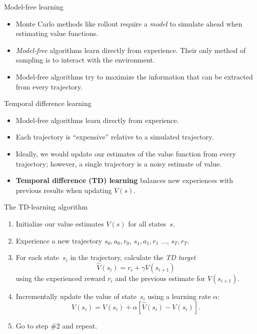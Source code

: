 \documentclass[9pt]{beamer}
\newcommand\lspace{\addtolength{\itemsep}{0.5\baselineskip}}
\begin{document}
\begin{frame}{Model-free learning}

\begin{itemize}\lspace
	\item Monte Carlo methods like rollout require a \emph{model} to simulate ahead when estimating value functions.
	\item \emph{Model-free} algorithms learn directly from experience. Their only method of sampling is to interact with the environment.
	\item Model-free algorithms try to maximize the information that can be extracted from every trajectory.
\end{itemize}
	
\end{frame}

\begin{frame}{Temporal difference learning}

\begin{itemize}\lspace
	\item Model-free algorithms learn directly from experience.
	\item Each trajectory is ``expensive'' relative to a simulated trajectory.
	\item Ideally, we would update our estimates of the value function from every trajectory; however, a single trajectory is a noisy estimate of value.
	\item \textbf{Temporal difference (TD) learning} balances new experiences with previous results when updating $V(s)$.
\end{itemize}

\end{frame}

\begin{frame}{The TD-learning algorithm}

\begin{enumerate}\lspace
	\item Initialize our value estimates $V(s)$ for all states~$s$.
	\item<2-> Experience a new trajectory $s_0,a_0,r_0$, $s_1,a_1,r_1$ $\ldots$, $s_T,r_T$.
	\item<3-> For each state~$s_i$ in the trajectory, calculate the \emph{TD target}
		\[ \hat{V}(s_i) = r_i + \gamma V(s_{i+1}) \]
		using the experienced reward $r_i$ and the previous estimate for $V(s_{i+1})$.
	\item<4-> Incrementally update the value of state~$s_i$ using a learning rate $\alpha$:
		\[ V(s_i) = V(s_i) + \alpha\left[ \hat{V}(s_i) - V(s_i) \right]. \]
	\item<5-> Go to step \#2 and repeat.
\end{enumerate}

\bigskip
{}
	
\end{frame}
\end{document}
